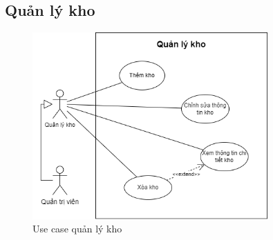 \subsection{Quản lý kho}
\begin{figure}[!htp]
    \centering
    \includegraphics[width=9cm]{img/UseCase/UseCase-Quản lý kho.drawio.png}
    \newline
    \caption{Use case quản lý kho}
\end{figure}

